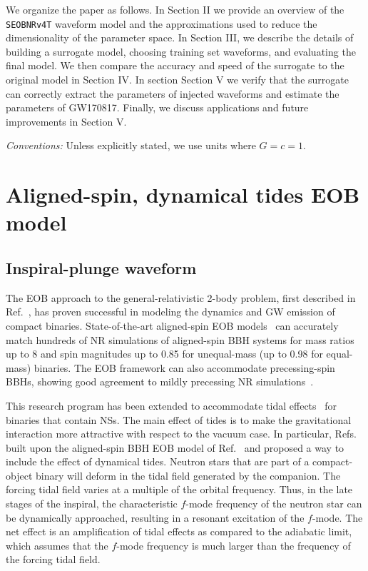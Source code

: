 \documentclass[prd,aps,letter,twocolumn,floatfix,notitlepage,nofootinbib]{revtex4-1}
\begin{document}
We organize the paper as follows. In Section II we provide an overview of the \texttt{SEOBNRv4T} waveform model and the approximations used to reduce the dimensionality of the parameter space. In Section III, we describe the details of building a surrogate model, choosing training set waveforms, and evaluating the final model. We then compare the accuracy and speed of the surrogate to the original model in Section IV. In section Section V we verify that the surrogate can correctly extract the parameters of injected waveforms and estimate the parameters of GW170817. Finally, we discuss applications and future improvements in Section V.

\textit{Conventions:} Unless explicitly stated, we use units where $G=c=1$.


\section{Aligned-spin, dynamical tides EOB model}
\label{sec:eob}

\subsection{Inspiral-plunge waveform}

The EOB approach to the general-relativistic 2-body problem, first described in Ref.~\cite{Buonanno:1998gg}, has proven successful in modeling the dynamics and GW emission of compact binaries. State-of-the-art aligned-spin EOB models~\cite{Bohe:2016gbl,Nagar:2017jdw} can accurately match hundreds of NR simulations of aligned-spin BBH systems for mass ratios up to 8 and spin magnitudes up to 0.85 for unequal-mass (up to 0.98 for equal-mass) binaries. The EOB framework can also accommodate precessing-spin BBHs, showing good agreement to mildly precessing NR simulations~\cite{Babak:2016tgq}. 

This research program has been extended to accommodate tidal effects~\cite{Damour:2009wj,Vines:2010ca,Damour:2012yf,Bini:2012gu,Bernuzzi:2014owa,Hinderer:2016eia,Steinhoff:2016rfi,Dietrich:2017feu} for binaries that contain NSs. The main effect of tides is to make the gravitational interaction more attractive with respect to the vacuum case. In particular, Refs.~\cite{Hinderer:2016eia,Steinhoff:2016rfi} built upon the aligned-spin BBH EOB model of Ref.~\cite{Taracchini:2013rva} and proposed a way to include the effect of dynamical tides. Neutron stars that are part of a compact-object binary will deform in the tidal field generated by the companion. The forcing tidal field varies at a multiple of the orbital frequency. Thus, in the late stages of the inspiral, the characteristic $f$-mode frequency of the neutron star can be dynamically approached, resulting in a resonant excitation of the $f$-mode. The net effect is an amplification of tidal effects as compared to the adiabatic limit, which assumes that the $f$-mode frequency is much larger than the frequency of the forcing tidal field. 
\end{document}
